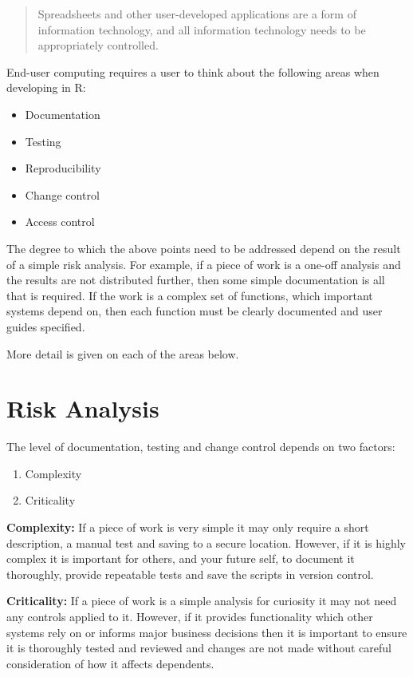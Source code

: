 \documentclass[]{book}
\providecommand{\tightlist}{%
  \setlength{\itemsep}{0pt}\setlength{\parskip}{0pt}}
\begin{document}
\begin{quote}
Spreadsheets and other user-developed applications are a form of information technology,
and all information technology needs to be appropriately controlled.
\end{quote}

End-user computing requires a user to think about the following areas when developing
in R:

\begin{itemize}
\tightlist
\item
  Documentation
\item
  Testing
\item
  Reproducibility
\item
  Change control
\item
  Access control
\end{itemize}

The degree to which the above points need to be addressed depend on the result of a simple risk
analysis. For example, if a piece of work is a one-off analysis and the results are not distributed
further, then some simple documentation is all that is required. If the work is a complex set of
functions, which important systems depend on, then each function must be clearly documented and
user guides specified.

More detail is given on each of the areas below.

\hypertarget{risk-analysis}{%
\section{Risk Analysis}\label{risk-analysis}}

The level of documentation, testing and change control depends on two factors:

\begin{enumerate}
\def\labelenumi{\arabic{enumi}.}
\tightlist
\item
  Complexity
\item
  Criticality
\end{enumerate}

\textbf{Complexity:} If a piece of work is very simple it may only require a short
description, a manual test and saving to a secure location. However, if it is highly
complex it is important for others, and your future self, to document it thoroughly,
provide repeatable tests and save the scripts in version control.

\textbf{Criticality:} If a piece of work is a simple analysis for curiosity it may not
need any controls applied to it. However, if it provides functionality which other
systems rely on or informs major business decisions then it is important to ensure
it is thoroughly tested and reviewed and changes are not made without careful
consideration of how it affects dependents.
\end{document}
